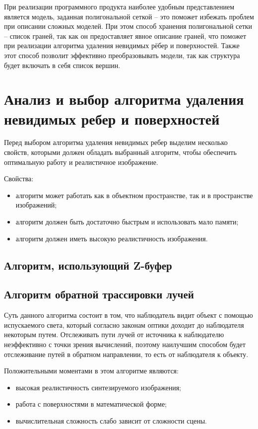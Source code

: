 При реализации программного продукта наиболее удобным представлением является модель, заданная полигональной сеткой – это поможет избежать проблем при описании сложных моделей. При этом способ хранения полигональной сетки – список граней, так как он предоставляет явное описание граней, что поможет при реализации алгоритма удаления невидимых рёбер и поверхностей. Также этот способ позволит эффективно преобразовывать модели, так как структура будет включать в себя список вершин. 



\section{Анализ и выбор алгоритма удаления невидимых ребер и поверхностей}

Перед выбором алгоритма удаления невидимых ребер выделим несколько свойств, которыми должен обладать выбранный алгоритм, чтобы обеспечить оптимальную работу и реалистичное изображение.

Свойства:	
\begin{itemize}
\item	алгоритм может работать как в объектном пространстве, так и в пространстве изображений;
\item	алгоритм должен быть достаточно быстрым и использовать мало памяти;
\item	алгоритм должен иметь высокую реалистичность изображения.
\end{itemize}

\subsection{Алгоритм, использующий Z-буфер}

\subsection{Алгоритм обратной трассировки лучей}

Суть данного алгоритма состоит в том, что наблюдатель видит объект с помощью испускаемого света, который согласно законам оптики доходит до наблюдателя некоторым путем. Отслеживать пути лучей от источника к наблюдателю неэффективно с точки зрения вычислений, поэтому наилучшим способом будет отслеживание путей в обратном направлении, то есть от наблюдателя к объекту.

Положительными моментами в этом алгоритме являются:
\begin{itemize}
\item	высокая реалистичность синтезируемого изображения;
\item	работа с поверхностями в математической форме;
\item	вычислительная сложность слабо зависит от сложности сцены.
\end{itemize}

